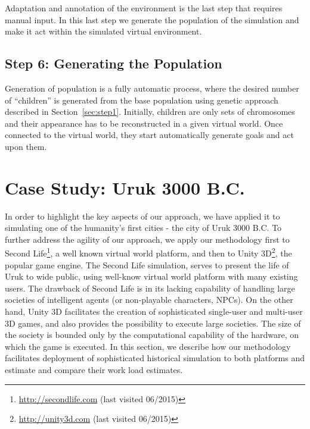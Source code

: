 Adaptation and annotation of the environment is the last step that requires manual input. In this last step we generate the population of the simulation and make it act within the simulated virtual environment.  



\subsection{Step 6: Generating the Population}

\label{sec:generation}

Generation of population is a fully automatic process, where the desired number of ``children'' is generated from the base population using genetic approach described in Section~\ref{sec:step1}. Initially, children are only sets of chromosomes and their appearance has to be reconstructed in a given virtual world. Once connected to the virtual world, they start automatically generate goals and act upon them.



\section{Case Study: Uruk 3000 B.C.}
\label{sec:CaseStudy}


In order to highlight the key aspects of our approach, we have applied it to simulating one of the humanity's first cities - the city of Uruk 3000 B.C. To further address the agility of our approach, we apply our methodology first to Second Life\footnote{\url{http://secondlife.com} (last visited 06/2015)}, a well known virtual world platform, and then to Unity 3D\footnote{\url{http://unity3d.com} (last visited 06/2015)}, the popular game engine. The Second Life simulation, serves to present the life of Uruk to wide public, using well-know virtual world platform with many existing users. The drawback of Second Life is in its lacking capability of handling large societies of intelligent agents (or non-playable characters, NPCs). On the other hand, Unity 3D facilitates the creation of sophisticated single-user and multi-user 3D games, and also provides the possibility to execute large societies. The size of the society is bounded only by the computational capability of the hardware, on which the game is executed. In this section, we describe how our methodology facilitates deployment of sophisticated historical simulation to both platforms and estimate and compare their work load estimates.  


